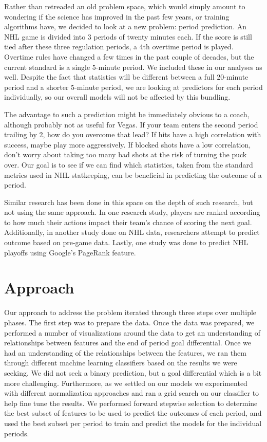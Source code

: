 \documentclass[twocolumn,letterpaper,12pt,notitlepage]{article}
\begin{document}
Rather than retreaded an old problem space, which would simply amount to wondering if the science has improved in the past few years, or training algorithms have, we decided to look at a new
problem: period prediction. An NHL game is divided into 3 periods of twenty minutes each. If the score
is still tied after these three regulation periods, a 4th  overtime period is played. Overtime rules have
changed a few times in the past couple of decades, but the current standard is a single 5-minute period.
We included these in our analyses as well. Despite the fact that statistics will be different between a full
20-minute period and a shorter 5-minute period, we are looking at predictors for each period individually,
so our overall models will not be affected by this bundling. \newline

The advantage to such a prediction might be immediately obvious to a coach, although probably
not as useful for Vegas. If your team enters the second period trailing by 2, how do you overcome that
lead? If hits have a high correlation with success, maybe play more aggressively. If blocked shots have a
low correlation, don’t worry about taking too many bad shots at the risk of turning the puck over. Our
goal is to see if we can find which statistics, taken from the standard metrics used in NHL statkeeping,
can be beneficial in predicting the outcome of a period.\newline

Similar research has been done in this space on the depth of such research, but not using the same approach.  In one research study, players are ranked according to how much their actions impact their team's chance of scoring the next goal.\cite{scoringimpact}  Additionally, in another study done on NHL data, researchers attempt to predict outcome based on pre-game data.\cite{scoringimpact}  Lastly, one study was done to predict NHL playoffs using Google's PageRank feature.\cite{pagerank} 

\section{Approach}

Our approach to address the problem iterated through three steps over multiple phases. The first step was to prepare the data. Once the data was prepared, we performed a number of visualizations around the data to get an understanding of relationships between features and the end of period goal differential. Once we had an understanding of the relationships between the features, we ran them through different machine learning classifiers based on the results we were seeking. We did not seek a binary prediction, but a goal differential which is a bit more challenging. Furthermore, as we settled on our models we experimented with different normalization approaches and ran a grid search on our classifier to help fine tune the results. We performed forward stepwise selection to determine the best subset of features to be used to predict the outcomes of each period, and used the best subset per period to train and predict the models for the individual periods.
\end{document}
